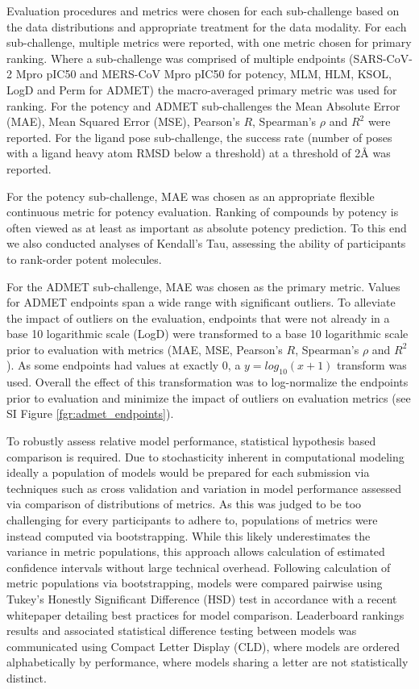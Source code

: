 \documentclass[journal=jcim,manuscript=article]{achemso}
\begin{document}
Evaluation procedures and metrics were chosen for each sub-challenge based on the data distributions and appropriate treatment for the data modality. For each sub-challenge, multiple metrics were reported, with one metric chosen for primary ranking. Where a sub-challenge was comprised of multiple endpoints (SARS-CoV-2 Mpro pIC50 and MERS-CoV Mpro pIC50 for potency, MLM, HLM, KSOL, LogD and Perm for ADMET) the macro-averaged primary metric was used for ranking. For the potency and ADMET sub-challenges the Mean Absolute Error (MAE), Mean Squared Error (MSE), Pearson's $R$, Spearman's $\rho$ and $R^2$ were reported. For the ligand pose sub-challenge, the success rate (number of poses with a ligand heavy atom RMSD below a threshold) at a threshold of 2Å was reported.

For the potency sub-challenge, MAE was chosen as an appropriate flexible continuous metric for potency evaluation. Ranking of compounds by potency is often viewed as at least as important as absolute potency prediction. To this end we also conducted analyses of Kendall's Tau, assessing the ability of participants to rank-order potent molecules. 

For the ADMET sub-challenge, MAE was chosen as the primary metric. Values for ADMET endpoints span a wide range with significant outliers. To alleviate the impact of outliers on the evaluation, endpoints that were not already in a base 10 logarithmic scale (LogD) were transformed to a base 10 logarithmic scale prior to evaluation with metrics (MAE, MSE, Pearson's $R$, Spearman's $\rho$ and $R^2$). As some endpoints had values at exactly 0, a $ y=log_{10}(x + 1)$ transform was used. Overall the effect of this transformation was to log-normalize the endpoints prior to evaluation and minimize the impact of outliers on evaluation metrics (see SI Figure \ref{fgr:admet_endpoints}).  

To robustly assess relative model performance, statistical hypothesis based comparison is required. Due to stochasticity inherent in computational modeling ideally a population of models would be prepared for each submission via techniques such as cross validation and variation in model performance assessed via comparison of distributions of metrics. As this was judged to be too challenging for every participants to adhere to, populations of metrics were instead computed via bootstrapping. While this likely underestimates the variance in metric populations, this approach allows calculation of estimated confidence intervals without large technical overhead. Following calculation of metric populations via bootstrapping, models were compared pairwise using Tukey's Honestly Significant Difference (HSD) test in accordance with a recent whitepaper detailing best practices for model comparison. Leaderboard rankings results and associated statistical difference testing between models was communicated using Compact Letter Display (CLD), where models are ordered alphabetically by performance, where models sharing a letter are not statistically distinct. 
\end{document}
